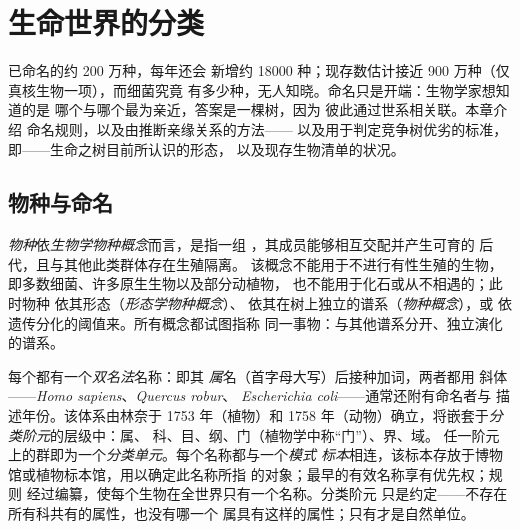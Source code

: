 \chapter{生命世界的分类}\label{ch:b1:classifying-biodiversity}

已命名的约 200 万种，每年还会
新增约 \num{18000} 种；现存数估计接近
900 万种（仅真核生物一项），而细菌究竟
有多少种，无人知晓。命名只是开端：生物学家想知道的是
哪个与哪个最为亲近，答案是一棵树，因为
彼此通过世系相关联。本章介绍
命名规则，以及由推断亲缘关系的方法——
以及用于判定竞争树优劣的标准，
即——生命之树目前所认识的形态，
以及现存生物清单的状况。

\section{物种与命名}

\begin{definition}[物种]\label{def:b1:classifying-biodiversity:species}
\emph{物种}依\emph{生物学物种概念}而言，是指一组
，其成员能够相互交配并产生可育的
后代，且与其他此类群体存在生殖隔离。
该概念不能用于不进行有性生殖的生物，
即多数细菌、许多原生生物以及部分动植物，
也不能用于化石或从不相遇的；此时物种
依其形态（\emph{形态学物种概念}）、
依其在树上独立的谱系（\emph{物种概念}），或
依遗传分化的阈值来。所有概念都试图指称
同一事物：与其他谱系分开、独立演化的谱系。
\end{definition}

\begin{definition}[命名法与分类阶元]\label{def:b1:classifying-biodiversity:nomenclature}
每个都有一个\emph{双名法}名称：即其
\emph{属}名（首字母大写）后接种加词，两者都用
斜体——\emph{Homo sapiens}、\emph{Quercus robur}、
\emph{Escherichia coli}——通常还附有命名者与
描述年份。该体系由林奈于 1753 年（植物）和
1758 年（动物）确立，将嵌套于\emph{分类阶元}的层级中：属、
科、目、纲、门（植物学中称“门”）、界、域。
任一阶元上的群即为一个\emph{分类单元}。每个名称都与一个\emph{模式
标本}相连，该标本存放于博物馆或植物标本馆，用以确定此名称所指
的对象；最早的有效名称享有优先权；规则
经过编纂，使每个生物在全世界只有一个名称。分类阶元
只是约定——不存在所有科共有的属性，也没有哪一个
属具有这样的属性；只有才是自然单位。
\end{definition}

